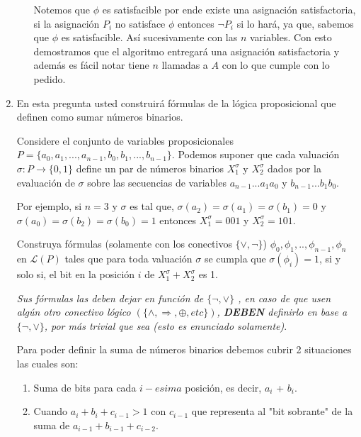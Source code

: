 \documentclass[10pt]{article}
\begin{document}
\begin{enumerate}
\begin{enumerate}
        Notemos que $\phi$ es satisfacible por ende existe una asignación satisfactoria, si la asignación $P_i$ no 
        satisface $\phi$ entonces $\neg P_i$ si lo hará, ya que, sabemos que $\phi$ es satisfacible. Así sucesivamente
        con las $n$ variables. Con esto demostramos que el algoritmo entregará una asignación satisfactoria y además 
        es fácil notar  tiene $n$ llamadas a $A$ con lo que cumple con lo pedido.
        

        
    \end{enumerate}
    \item En esta pregunta usted construirá fórmulas de la lógica proposicional que definen como sumar números
    binarios.

    Considere el conjunto de variables proposicionales \newline 
    $P=\{a_0, a_1, ... , a_{n-1},b_0, b_1, ..., b_{n-1}\}$.
    Podemos suponer que cada valuación $\sigma : P\rightarrow\{0,1\}$ define un par de números binarios $X^{\sigma}_1$ 
    y $X^{\sigma}_2$ dados por la evaluación de $\sigma$ sobre las secuencias de variables $a_{n-1}...a_1a_0 $ y 
    $b_{n-1}...b_1b_0$.
    
    Por ejemplo, si $n=3$ y $\sigma$ es tal que, $\sigma(a_2)=\sigma(a_1)=\sigma(b_1)=0$ y 
    $\sigma(a_0)=\sigma(b_2)=\sigma(b_0)=1$ entonces $X^{\sigma}_1=001$ y $X^{\sigma}_2=101$.

    Construya fórmulas (solamente con los conectivos $\{\vee ,\neg\}$) $\phi_0,\phi_1,..,\phi_{n-1},\phi_n$ en $\mathcal{L}(P)$
    tales que para toda valuación $\sigma$ se cumpla que $\sigma(\phi_i)=1$, si y solo si, el bit en la posición $i$
    de $X^{\sigma}_1+X^{\sigma}_2$ es 1.

    \textit{Sus fórmulas las deben dejar en función de $\{ \neg, \vee\}$ , en caso de que usen algún otro conectivo
    lógico $(\{ \wedge ,\Rightarrow,\oplus, etc\})$, \textbf{DEBEN} definirlo en base a $\{ \neg, \vee \}$, por más trivial que sea 
    (esto es enunciado solamente)}.

    Para poder definir la suma de números binarios debemos cubrir 2 situaciones las cuales son:
    \begin{enumerate}
        \item Suma de bits para cada $i-esima$ posición, es decir, $a_i$ + $b_i$.
        \item Cuando $a_i+b_i+c_{i-1}>1$ con $c_{i-1}$ que representa al "bit sobrante" de la suma de $a_{i-1}+b_{i-1}+c_{i-2}$.
    \end{enumerate}


\end{enumerate}
\end{document}
